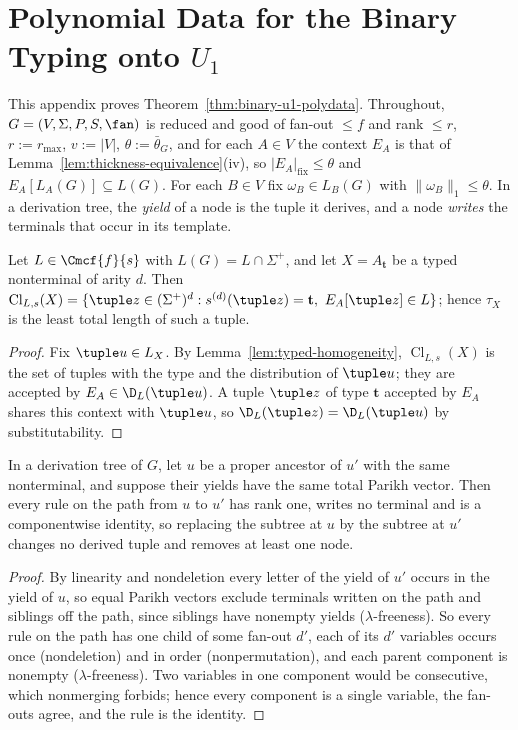 \section{Polynomial Data for the Binary Typing onto \texorpdfstring{$U_1$}{U1}}
\label{app:binary-u1}

This appendix proves Theorem~\ref{thm:binary-u1-polydata}.  Throughout,
$G=(V,\Sigma,P,S,\fan)$ is reduced and good of fan-out $\le f$ and rank
$\le r$, $r:=r_{\max}$, $v:=|V|$, $\theta:=\bar\theta_G$, and for each
$A\in V$ the context $E_A$ is that of Lemma~\ref{lem:thickness-equivalence}(iv),
so $|E_A|_{\mathrm{fix}}\le\theta$ and $E_A[L_A(G)]\subseteq L(G)$.  For each $B\in V$
fix $\omega_B\in L_B(G)$ with $\|\omega_B\|_1\le\theta$.  In a derivation tree, the
\emph{yield} of a node is the tuple it derives, and a node \emph{writes} the
terminals that occur in its template.

\begin{lemma}\label{lem:app-u1-fillers}
Let $L\in\Cmcf{f}{s}$ with $L(G)=L\cap\Sigma^+$, and let $X=A_{\mathbf t}$ be a typed
nonterminal of arity $d$.  Then
$\operatorname{Cl}_{L,s}(X)=\{\tuple z\in(\Sigma^+)^d:s^{(d)}(\tuple z)=\mathbf t,\
E_A[\tuple z]\in L\}$; hence $\tau_X$ is the least total length of such a tuple.
\end{lemma}

\begin{proof}
Fix $\tuple u\in L_X$.  By Lemma~\ref{lem:typed-homogeneity},
$\operatorname{Cl}_{L,s}(X)$ is the set of tuples with the type and the
distribution of $\tuple u$; they are accepted by $E_A\in\D_L(\tuple u)$.  A tuple
$\tuple z$ of type $\mathbf t$ accepted by $E_A$ shares this context with $\tuple u$,
so $\D_L(\tuple z)=\D_L(\tuple u)$ by substitutability.
\end{proof}

\begin{lemma}\label{lem:app-u1-identity}
In a derivation tree of $G$, let $u$ be a proper ancestor of $u'$ with the same
nonterminal, and suppose their yields have the same total Parikh vector.  Then
every rule on the path from $u$ to $u'$ has rank one, writes no terminal and
is a componentwise identity, so replacing the subtree at $u$ by the subtree at
$u'$ changes no derived tuple and removes at least one node.
\end{lemma}

\begin{proof}
By linearity and nondeletion every letter of the yield of $u'$ occurs in the
yield of $u$, so equal Parikh vectors exclude terminals written on the path
and siblings off the path, since siblings have nonempty yields
($\lambda$-freeness).  So every rule on the path has one child of some fan-out
$d'$, each of its $d'$ variables occurs once (nondeletion) and in order
(nonpermutation), and each parent component is nonempty ($\lambda$-freeness).
Two variables in one component would be consecutive, which nonmerging forbids;
hence every component is a single variable, the fan-outs agree, and the rule is
the identity.
\end{proof}

